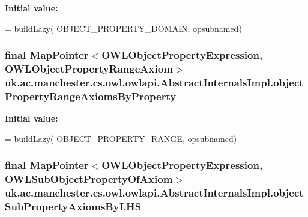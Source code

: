 {\bfseries Initial value\-:}
\begin{DoxyCode}
= buildLazy(
            OBJECT\_PROPERTY\_DOMAIN, opsubnamed)
\end{DoxyCode}
\hypertarget{classuk_1_1ac_1_1manchester_1_1cs_1_1owl_1_1owlapi_1_1_abstract_internals_impl_a9efdc4e72374123b825f0dd5eb5cc71f}{
\subsubsection[{object\-Property\-Range\-Axioms\-By\-Property}]{\setlength{\rightskip}{0pt plus 5cm}final Map\-Pointer$<${\bf O\-W\-L\-Object\-Property\-Expression}, {\bf O\-W\-L\-Object\-Property\-Range\-Axiom}$>$ uk.\-ac.\-manchester.\-cs.\-owl.\-owlapi.\-Abstract\-Internals\-Impl.\-object\-Property\-Range\-Axioms\-By\-Property\hspace{0.3cm}{\ttfamily [protected]}}}\label{classuk_1_1ac_1_1manchester_1_1cs_1_1owl_1_1owlapi_1_1_abstract_internals_impl_a9efdc4e72374123b825f0dd5eb5cc71f}
{\bfseries Initial value\-:}
\begin{DoxyCode}
= buildLazy(
            OBJECT\_PROPERTY\_RANGE, opsubnamed)
\end{DoxyCode}
\hypertarget{classuk_1_1ac_1_1manchester_1_1cs_1_1owl_1_1owlapi_1_1_abstract_internals_impl_af46944f936be56c97588c41d124ae3ed}{
\subsubsection[{object\-Sub\-Property\-Axioms\-By\-L\-H\-S}]{\setlength{\rightskip}{0pt plus 5cm}final Map\-Pointer$<${\bf O\-W\-L\-Object\-Property\-Expression}, {\bf O\-W\-L\-Sub\-Object\-Property\-Of\-Axiom}$>$ uk.\-ac.\-manchester.\-cs.\-owl.\-owlapi.\-Abstract\-Internals\-Impl.\-object\-Sub\-Property\-Axioms\-By\-L\-H\-S\hspace{0.3cm}{\ttfamily [protected]}}}\label{classuk_1_1ac_1_1manchester_1_1cs_1_1owl_1_1owlapi_1_1_abstract_internals_impl_af46944f936be56c97588c41d124ae3ed}

